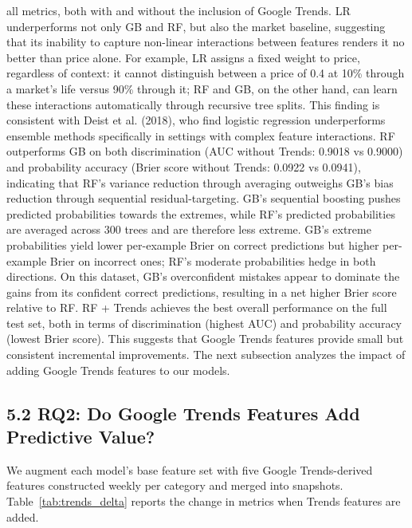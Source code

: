 \documentclass[11pt,twocolumn]{article}
\begin{document}
all metrics, both with and without the inclusion of Google Trends. LR underperforms not only GB and RF, but also the market baseline, suggesting that its inability to capture non-linear interactions between features renders it no better than price alone. For example, LR assigns a fixed weight to price, regardless of context: it cannot distinguish between a price of 0.4 at 10\% through a market's life versus 90\% through it; RF and GB, on the other hand, can learn these interactions automatically through recursive tree splits. This finding is consistent with Deist et al. (2018), who find logistic regression underperforms ensemble methods specifically in settings with complex feature interactions. RF outperforms GB on both discrimination (AUC without Trends: 0.9018 vs 0.9000) and probability accuracy (Brier score without Trends: 0.0922 vs 0.0941), indicating that RF's variance reduction through averaging outweighs GB's bias reduction through sequential residual-targeting. GB's sequential boosting pushes predicted probabilities towards the extremes, while RF's predicted probabilities are averaged across 300 trees and are therefore less extreme. GB's extreme probabilities yield lower per-example Brier on correct predictions but higher per-example Brier on incorrect ones; RF's moderate probabilities hedge in both directions. On this dataset, GB's overconfident mistakes appear to dominate the gains from its confident correct predictions, resulting in a net higher Brier score relative to RF. RF + Trends achieves the
best overall performance on the full test set, both in terms of discrimination (highest AUC) and probability accuracy (lowest Brier score). This suggests that Google Trends features provide small but consistent incremental improvements. The next subsection analyzes the impact of adding Google Trends features to our models.

\subsection*{5.2 RQ2: Do Google Trends Features Add Predictive Value?}

  We augment each model's base feature set with five Google Trends-derived
  features constructed weekly per category and merged into snapshots.
  Table~\ref{tab:trends_delta} reports the change in metrics when
  Trends features are added.
\end{document}
